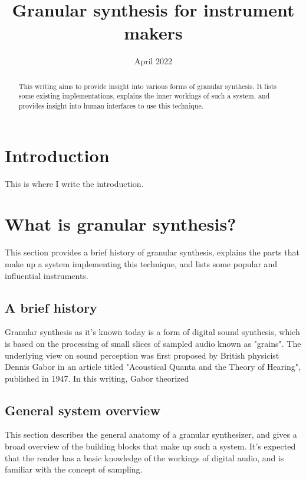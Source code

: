 \documentclass[10pt, twocolumn]{IEEEtran}
\title{Granular synthesis for instrument makers}
\author{	
	\IEEEauthorblockN{Daniël Kamp\\}
    \IEEEauthorblockA{HKU University of the Arts Utrecht
    \\daniel.kamp@student.hku.nl}
    }
\date{April 2022}
\begin{document}
\maketitle

\begin{abstract}
This writing aims to provide insight into various forms of granular synthesis. It lists some existing implementations, explains the inner workings of such a system, and provides insight into human interfaces to use this technique.
\end{abstract}

\section*{Introduction}
This is where I write the introduction.

\section{What is granular synthesis?}
This section provides a brief history of granular synthesis, explains the parts that make up a system implementing this technique, and lists some popular and influential instruments.

\subsection{A brief history}
Granular synthesis as it's known today is a form of digital sound synthesis, which is based on the processing of small slices of sampled audio known as "grains". The underlying view on sound perception was first proposed by British physicist Dennis Gabor in an article titled "Acoustical Quanta and the Theory of Hearing", published in 1947. In this writing, Gabor theorized

\subsection{General system overview}
This section describes the general anatomy of a granular synthesizer, and gives a broad overview of the building blocks that make up such a system. It's expected that the reader has a basic knowledge of the workings of digital audio, and is familiar with the concept of sampling.
\end{document}
